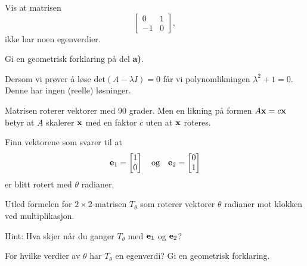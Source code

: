 \begin{oppgave}

\begin{punkt}
Vis at matrisen
\[
\begin{bmatrix}
 0 & 1\\
-1 & 0
\end{bmatrix},
\]
ikke har noen egenverdier.
\end{punkt}

\begin{punkt}
Gi en geometrisk forklaring på del \textbf{a)}.
\end{punkt}

\end{oppgave}


\begin{losning}

\begin{punkt}
Dersom vi prøver å løse $\text{det}(A-\lambda I)=0$ får vi polynomlikningen $\lambda^2+1=0$. Denne har ingen (reelle) løsninger.
\end{punkt}

\begin{punkt}
Matrisen roterer vektorer med 90 grader. Men en likning på formen $A\mathbf{x}=c\mathbf{x}$ betyr at $A$ skalerer $\mathbf{x}$ med en faktor $c$ uten at $\mathbf{x}$ roteres.
\end{punkt}

\end{losning}



\begin{oppgave}

\begin{punkt}
Finn vektorene som svarer til at $$\mathbf{e}_1 = \begin{bmatrix} 1 \\ 0 \end{bmatrix}\quad \text{og}\quad\mathbf{e}_2= \begin{bmatrix} 0 \\ 1 \end{bmatrix}$$ er blitt rotert med $\theta$ radianer.
\end{punkt}

\begin{punkt}
Utled formelen for $2 \times 2$-matrisen $T_\theta$ som roterer vektorer $\theta$ radianer mot klokken ved multiplikasjon.

\noindent
Hint: Hva skjer når du ganger $T_\theta$ med $\mathbf{e}_1$ og $\mathbf{e}_2$?
\end{punkt}

\begin{punkt}
For hvilke verdier av $\theta$ har $T_\theta$ en egenverdi? Gi en geometrisk forklaring.
\end{punkt}


\end{oppgave}



